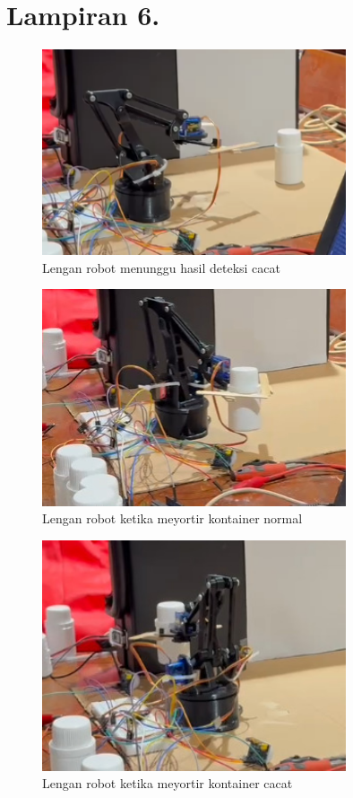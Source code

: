 \vspace{1em}

\section*{Lampiran 6. }
\label{Lampiran 6}
\begin{figure}[H]
  \centering
  \includegraphics[width=0.8\textwidth]{gambar/lampiran/robot.png} \\
  Lengan robot menunggu hasil deteksi cacat
\end{figure}
\vspace{-1em}

\begin{figure}[H]
  \centering
  \includegraphics[width=0.8\textwidth]{gambar/robot_normal.jpeg} \\
  Lengan robot ketika meyortir kontainer normal
\end{figure}
\vspace{-1em}

\begin{figure}[H]
  \centering
  \includegraphics[width=0.8\textwidth]{gambar/robot_cacat.jpeg} \\
  Lengan robot ketika meyortir kontainer cacat
\end{figure}
\vspace{-1em}
